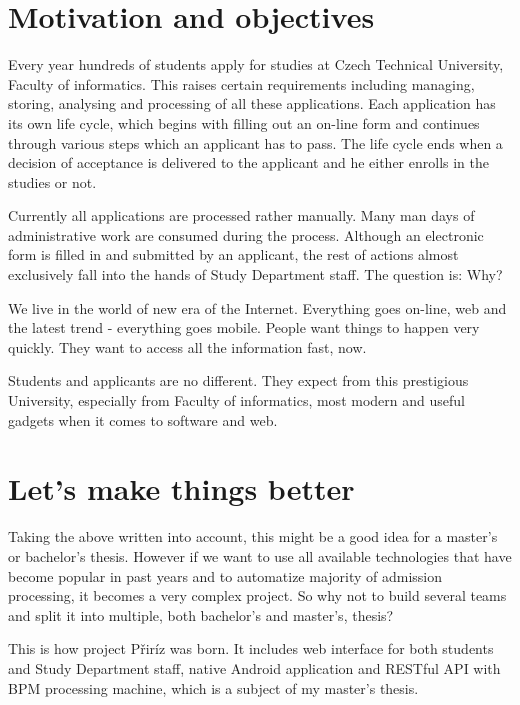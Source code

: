 \begin{introduction}
	\section{Motivation and objectives}

	Every year hundreds of students apply for studies at Czech Technical University, Faculty of informatics. This
	raises certain requirements including managing, storing, analysing and processing of all these applications.
	Each application has its own life cycle, which begins with filling out an on-line form and continues through various
	steps which an applicant has to pass. The life cycle ends when a decision of acceptance is delivered to the applicant
	and he either enrolls in the studies or not.
	
	Currently all applications are processed rather manually. Many man days of administrative work are consumed during the
	process. Although an electronic form is filled in and submitted by an applicant, the rest of actions almost exclusively
	fall into the hands of Study Department staff. The question is: Why?
	
	We live in the world of new era of the Internet. Everything goes on-line, web and the latest trend - everything goes
	mobile. People want things to happen very quickly. They want to access all the information fast, now.
	
	Students and applicants are no different. They expect from this prestigious University, especially from Faculty of
	informatics, most modern and useful gadgets when it comes to software and web.
	
	\section{Let's make things better}
	
	Taking the above written into account, this might be a good idea for a master's or bachelor's thesis. However if we
	want to use all available technologies that have become popular in past years and to automatize majority of admission
	processing, it becomes a very complex project. So why not to build several teams and split it into multiple, both
	bachelor's and master's, thesis?
	
	This is how project Přiríz was born. It includes web interface for both students and Study Department staff, native
	Android application and RESTful API with BPM processing machine, which is a subject of my master's thesis.
	 
\end{introduction}